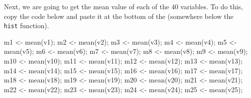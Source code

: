\documentclass[
  openany]{krantz}
\makeatletter
\newenvironment{Shaded}{\begin{snugshade}}{\end{snugshade}}
\newcommand{\FunctionTok}[1]{\textcolor[rgb]{0,0,0}{#1}}
\newcommand{\NormalTok}[1]{#1}
\newcommand{\OtherTok}[1]{\textcolor[rgb]{0.37,0.37,0.37}{#1}}
\newenvironment{kframe}{%
\medskip{}
\setlength{\fboxsep}{.8em}
 \def\at@end@of@kframe{}%
 \ifinner\ifhmode%
  \def\at@end@of@kframe{\end{minipage}}%
  \begin{minipage}{\columnwidth}%
 \fi\fi%
 \def\FrameCommand##1{\hskip\@totalleftmargin \hskip-\fboxsep
 \colorbox{shadecolor}{##1}\hskip-\fboxsep
     \hskip-\linewidth \hskip-\@totalleftmargin \hskip\columnwidth}%
 \MakeFramed {\advance\hsize-\width
   \@totalleftmargin\z@ \linewidth\hsize
   \@setminipage}}%
 {\par\unskip\endMakeFramed%
 \at@end@of@kframe}
\renewenvironment{Shaded}{\begin{kframe}}{\end{kframe}}
\makeatother
\begin{document}
\begin{verbatim}






\end{verbatim}

Next, we are going to get the mean value of each of the 40 variables.
To do this, copy the code below and paste it at the bottom of the  (somewhere below the \texttt{hist} function).

\begin{Shaded}
\begin{Highlighting}[]
\NormalTok{m1  }\OtherTok{\textless{}{-}} \FunctionTok{mean}\NormalTok{(v1);}
\NormalTok{m2  }\OtherTok{\textless{}{-}} \FunctionTok{mean}\NormalTok{(v2);}
\NormalTok{m3  }\OtherTok{\textless{}{-}} \FunctionTok{mean}\NormalTok{(v3);}
\NormalTok{m4  }\OtherTok{\textless{}{-}} \FunctionTok{mean}\NormalTok{(v4);}
\NormalTok{m5  }\OtherTok{\textless{}{-}} \FunctionTok{mean}\NormalTok{(v5);}
\NormalTok{m6  }\OtherTok{\textless{}{-}} \FunctionTok{mean}\NormalTok{(v6);}
\NormalTok{m7  }\OtherTok{\textless{}{-}} \FunctionTok{mean}\NormalTok{(v7);}
\NormalTok{m8  }\OtherTok{\textless{}{-}} \FunctionTok{mean}\NormalTok{(v8);}
\NormalTok{m9  }\OtherTok{\textless{}{-}} \FunctionTok{mean}\NormalTok{(v9);}
\NormalTok{m10 }\OtherTok{\textless{}{-}} \FunctionTok{mean}\NormalTok{(v10);}
\NormalTok{m11 }\OtherTok{\textless{}{-}} \FunctionTok{mean}\NormalTok{(v11);}
\NormalTok{m12 }\OtherTok{\textless{}{-}} \FunctionTok{mean}\NormalTok{(v12);}
\NormalTok{m13 }\OtherTok{\textless{}{-}} \FunctionTok{mean}\NormalTok{(v13);}
\NormalTok{m14 }\OtherTok{\textless{}{-}} \FunctionTok{mean}\NormalTok{(v14);}
\NormalTok{m15 }\OtherTok{\textless{}{-}} \FunctionTok{mean}\NormalTok{(v15);}
\NormalTok{m16 }\OtherTok{\textless{}{-}} \FunctionTok{mean}\NormalTok{(v16);}
\NormalTok{m17 }\OtherTok{\textless{}{-}} \FunctionTok{mean}\NormalTok{(v17);}
\NormalTok{m18 }\OtherTok{\textless{}{-}} \FunctionTok{mean}\NormalTok{(v18);}
\NormalTok{m19 }\OtherTok{\textless{}{-}} \FunctionTok{mean}\NormalTok{(v19);}
\NormalTok{m20 }\OtherTok{\textless{}{-}} \FunctionTok{mean}\NormalTok{(v20);}
\NormalTok{m21 }\OtherTok{\textless{}{-}} \FunctionTok{mean}\NormalTok{(v21);}
\NormalTok{m22 }\OtherTok{\textless{}{-}} \FunctionTok{mean}\NormalTok{(v22);}
\NormalTok{m23 }\OtherTok{\textless{}{-}} \FunctionTok{mean}\NormalTok{(v23);}
\NormalTok{m24 }\OtherTok{\textless{}{-}} \FunctionTok{mean}\NormalTok{(v24);}
\NormalTok{m25 }\OtherTok{\textless{}{-}} \FunctionTok{mean}\NormalTok{(v25);}

\end{Highlighting}
\end{Shaded}
\end{document}
